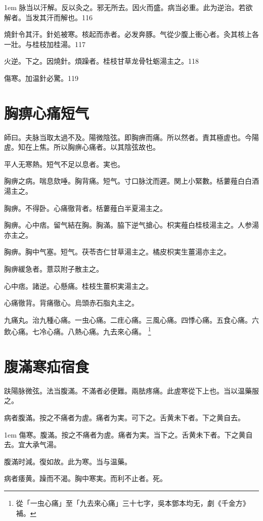 \hangindent 1em
脉当以汗解。反以灸之。邪无所去。因火而盛。病当必重。此为逆治。若欲解者。当发其汗而解也。{\gaoben}116

燒針令其汗。針処被寒。核起而赤者。必发奔豚。气從少腹上衝心者。灸其核上各一壯。与桂枝加桂湯。117

火逆。下之。因燒針。煩躁者。桂枝甘草龙骨牡蛎湯主之。118

傷寒。加温針必驚。119

\chapter{胸痹心痛短气}

師曰。夫脉当取太過不及。陽微陰弦。即胸痹而痛。所以然者。責其極虗也。今陽虗。知在上焦。所以胸痹心痛者。以其陰弦故也。

平人无寒熱。短气不足以息者。実也。

胸痹之病。喘息欬唾。胸背痛。短气。寸口脉沈而遲。関上小緊數。栝蔞薤白白酒湯主之。

胸痹。不得卧。心痛徹背者。栝蔞薤白半夏湯主之。

胸痹。心中痞。留气結在胸。胸滿。脇下逆{\khaaitp 气}搶心。枳実薤白桂枝湯主之。人参湯亦主之。

胸痹。胸中气塞。短气。茯苓杏仁甘草湯主之。橘{\khaaitp 皮}枳{\khaaitp 実生}薑湯亦主之。

胸痹緩急者。薏苡附子散主之。

心中痞。諸逆。心懸痛。桂枝生薑枳実湯主之。

心痛徹背。背痛徹心。烏頭赤石脂丸主之。

九痛丸。治九種心痛。{\khaaitp 一虫心痛。二疰心痛。三風心痛。四悸心痛。五食心痛。六飲心痛。七冷心痛。八熱心痛。九去來心痛。}
	\footnote{
		從「一虫心痛」至「九去來心痛」三十七字，吳本鄧本均无，劇《千金方》補。
	}

\chapter{腹滿寒疝宿食}

趺陽脉微弦。法当腹滿。不滿者必便難。兩胠疼痛。此虗寒從下上也。当以温藥服之。

病者腹滿。按之不痛{\khaaitp 者}为虗。痛者为実。可下之。舌黄未下者。下之黄自去。

\hangindent 1em
傷寒。腹滿。按之不痛者为虗。痛者为実。当下之。舌黄未下者。下之黄自去。宜大承气湯。{\yuhan}

腹滿时減。復如故。此为寒。当与温藥。

病者痿黄。躁而不渴。胸中寒実。而利不止者。死。

